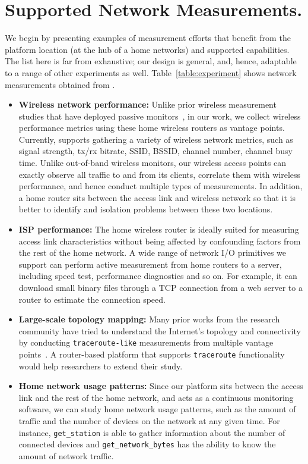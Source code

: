 {\section{Supported Network Measurements.}
\label{sec.network_measurement}
We begin by presenting examples of measurement efforts that benefit from the platform location (at the hub of a home networks) and supported capabilities. The list here is far from exhaustive; our design is general, and, hence, adaptable to a range of other experiments as well. Table~\ref{table:experiment} shows network measurements obtained from \sysname.

\begin{itemize}
\item \textbf{Wireless network performance:} Unlike prior wireless measurement studies that have deployed passive monitors~\cite{mahajan2006analyzing,raghavendra2009wi,papagiannaki2006experimental}, in our work, we collect wireless performance metrics using these home wireless routers as vantage points. Currently, \sysname supports gathering a variety of wireless network metrics, such as signal strength, tx/rx bitrate, SSID, BSSID, channel number, channel busy time. Unlike out-of-band wireless monitors, our wireless access points can exactly observe all traffic to and from its clients, correlate them with wireless performance, and hence conduct multiple types of measurements. In addition, a home router sits between the access link and wireless network so that it is better to identify and isolation problems between these two locations.

\item \textbf{ISP performance:} The home wireless router is ideally suited for measuring access link characteristics without being affected by confounding factors from the rest of the home network. A wide range of network I/O primitives we support can perform active measurement from home routers to a server, including speed test, performance diagnostics and so on. For example, it can download small binary files through a TCP connection from a web server to a router to estimate the connection speed.

\item \textbf{Large-scale topology mapping:} Many prior works from the research community have tried to understand the Internet's topology and connectivity by conducting \texttt{traceroute-like} measurements from multiple vantage points~\cite{paxson1996end,chen2009sidewalk}. A router-based platform that supports \texttt{traceroute} functionality would help researchers to extend their study.

\item \textbf{Home network usage patterns:} Since our platform sits between the access link and the rest of the home network, and acts as a continuous monitoring software, we can study home network usage patterns, such as the amount of traffic and the number of devices on the network at any given time. For instance, \texttt{get\_station} is able to gather information about the number of connected devices and \texttt{get\_network\_bytes} has the ability to know the amount of network traffic.    
\end{itemize} 
\par}
